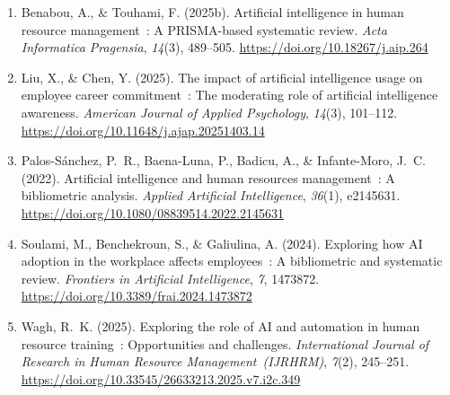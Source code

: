 \documentclass[12pt,a4paper]{article}
\begin{document}
\begin{enumerate}
\item Benabou, A., \& Touhami, F. (2025b). Artificial intelligence in human resource
  management~: A PRISMA-based systematic review. \textit{Acta Informatica Pragensia},
  \textit{14}(3), 489--505.
  \url{https://doi.org/10.18267/j.aip.264}

\item Liu, X., \& Chen, Y. (2025). The impact of artificial intelligence usage on
  employee career commitment~: The moderating role of artificial intelligence awareness.
  \textit{American Journal of Applied Psychology}, \textit{14}(3), 101--112.
  \url{https://doi.org/10.11648/j.ajap.20251403.14}

\item Palos-Sánchez, P.~R., Baena-Luna, P., Badicu, A., \& Infante-Moro, J.~C. (2022).
  Artificial intelligence and human resources management~: A bibliometric analysis.
  \textit{Applied Artificial Intelligence}, \textit{36}(1), e2145631.
  \url{https://doi.org/10.1080/08839514.2022.2145631}

\item Soulami, M., Benchekroun, S., \& Galiulina, A. (2024). Exploring how AI adoption
  in the workplace affects employees~: A bibliometric and systematic review.
  \textit{Frontiers in Artificial Intelligence}, \textit{7}, 1473872.
  \url{https://doi.org/10.3389/frai.2024.1473872}

\item Wagh, R.~K. (2025). Exploring the role of AI and automation in human resource
  training~: Opportunities and challenges. \textit{International Journal of Research
  in Human Resource Management~(IJRHRM)}, \textit{7}(2), 245--251.
  \url{https://doi.org/10.33545/26633213.2025.v7.i2c.349}

\end{enumerate}
\end{document}
